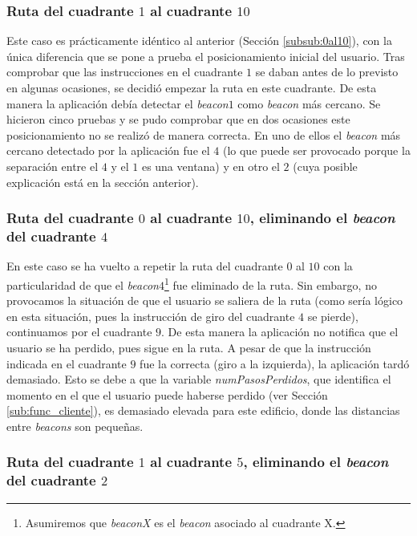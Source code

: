\subsubsection{Ruta del cuadrante $1$ al cuadrante $10$}

Este caso es prácticamente idéntico al anterior (Sección \ref{subsub:0al10}), con la única diferencia que se pone a prueba el posicionamiento inicial del usuario. Tras comprobar que las instrucciones en el cuadrante $1$ se daban antes de lo previsto en algunas ocasiones, se decidió empezar la ruta en este cuadrante. De esta manera la aplicación debía detectar el \textit{beacon$1$} como \textit{beacon} más cercano. Se hicieron cinco pruebas y se pudo comprobar que en dos ocasiones este posicionamiento no se realizó de manera correcta. En uno de ellos el \textit{beacon} más cercano detectado por la aplicación fue el $4$ (lo que puede ser provocado porque la separación entre el $4$ y el $1$ es una ventana) y en otro el $2$ (cuya posible explicación está en la sección anterior).

\subsubsection{Ruta del cuadrante $0$ al cuadrante $10$, eliminando el \textit{beacon} del cuadrante $4$}
\label{subsub:0al10sin4}

En este caso se ha vuelto a repetir la ruta del cuadrante $0$ al $10$ con la particularidad de que el \textit{beacon$4$}\footnote{Asumiremos que \textit{beaconX} es el \textit{beacon} asociado al cuadrante X.} fue eliminado de la ruta. Sin embargo, no provocamos la situación de que el usuario se saliera de la ruta (como sería lógico en esta situación, pues la instrucción de giro del cuadrante $4$ se pierde), continuamos por el cuadrante $9$. De esta manera la aplicación no notifica que el usuario se ha perdido, pues sigue en la ruta. A pesar de que la instrucción indicada en el cuadrante $9$ fue la correcta (giro a la izquierda), la aplicación tardó demasiado. Esto se debe a que la variable \textit{numPasosPerdidos}, que identifica el momento en el que el usuario puede haberse perdido (ver Sección \ref{sub:func_cliente}), es demasiado elevada para este edificio, donde las distancias entre \textit{beacons} son pequeñas.


\subsubsection{Ruta del cuadrante $1$ al cuadrante $5$, eliminando el \textit{beacon} del cuadrante $2$}

